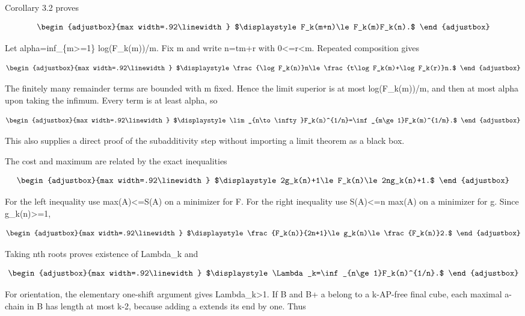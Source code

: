 Corollary 3.2 proves

\[
\begin{adjustbox}{max width=.92\linewidth}
$\displaystyle F_k(m+n)\le F_k(m)F_k(n).$
\end{adjustbox}
\]

Let alpha=inf\_\{m\textgreater=1\} log(F\_k(m))/m. Fix m and write n=tm+r with 0\textless=r\textless m. Repeated composition gives

\[
\begin{adjustbox}{max width=.92\linewidth}
$\displaystyle \frac{\log F_k(n)}n\le
 \frac{t\log F_k(m)+\log F_k(r)}n.$
\end{adjustbox}
\]

The finitely many remainder terms are bounded with m fixed. Hence the limit superior is at most log(F\_k(m))/m, and then at most alpha upon taking the infimum. Every term is at least alpha, so

\[
\begin{adjustbox}{max width=.92\linewidth}
$\displaystyle \lim_{n\to\infty}F_k(n)^{1/n}=\inf_{m\ge1}F_k(m)^{1/m}.$
\end{adjustbox}
\]

This also supplies a direct proof of the subadditivity step without importing a limit theorem as a black box.

The cost and maximum are related by the exact inequalities

\[
\begin{adjustbox}{max width=.92\linewidth}
$\displaystyle 2g_k(n)+1\le F_k(n)\le2ng_k(n)+1.$
\end{adjustbox}
\]

For the left inequality use max(A)\textless=S(A) on a minimizer for F. For the right inequality use S(A)\textless=n max(A) on a minimizer for g. Since g\_k(n)\textgreater=1,

\[
\begin{adjustbox}{max width=.92\linewidth}
$\displaystyle \frac{F_k(n)}{2n+1}\le g_k(n)\le\frac{F_k(n)}2.$
\end{adjustbox}
\]

Taking nth roots proves existence of Lambda\_k and

\[
\begin{adjustbox}{max width=.92\linewidth}
$\displaystyle \Lambda_k=\inf_{n\ge1}F_k(n)^{1/n}.$
\end{adjustbox}
\]

For orientation, the elementary one-shift argument gives Lambda\_k\textgreater1. If B and B+ a belong to a k-AP-free final cube, each maximal a-chain in B has length at most k-2, because adding a extends its end by one. Thus

